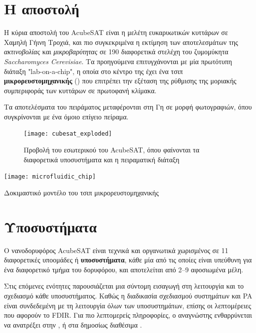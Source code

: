 \documentclass[a4paper,nobib]{tufte-book}
\begin{document}
\section{Η αποστολή}


Η κύρια αποστολή του AcubeSAT είναι η μελέτη ευκαρυωτικών κυττάρων σε Χαμηλή Γήινη Τροχιά, και πιο συγκεκριμένα η εκτίμηση των αποτελεσμάτων της \emph{ακτινοβολίας} και \emph{μικροβαρύτητας} σε 190 διαφορετικά στελέχη του ζυμομύκητα \emph{Saccharomyces Cerevisiae}. Τα προηγούμενα επιτυγχάνονται με μία πρωτότυπη διάταξη "lab-on-a-chip", η οποία στο κέντρο της έχει ένα τσιπ \textbf{μικρορευστομηχανικής} () \parencite{volpetti_microfluidic_biodisplay_2017} που επιτρέπει την εξέταση της ρύθμισης της μοριακής συμπεριφοράς των κυττάρων σε πρωτοφανή κλίμακα.

Τα αποτελέσματα του πειράματος μεταφέρονται στη Γη σε μορφή φωτογραφιών, όπου συγκρίνονται με ένα όμοιο επίγειο πείραμα.



\begin{figure}[th]
	\centering
	\texttt{[image: cubesat\_exploded]}
	\caption{Προβολή του εσωτερικού του AcubeSAT, όπου φαίνονται τα διαφορετικά υποσυστήματα και η πειραματική διάταξη}
\end{figure}

\begin{marginfigure}
	\texttt{[image: microfluidic\_chip]}
	\caption{Δοκιμαστικό μοντέλο του τσιπ μικρορευστομηχανικής}
	\label{fig:microfluidic_chip}
\end{marginfigure}

\section{Υποσυστήματα}

Ο νανοδορυφόρος AcubeSAT είναι τεχνικά και οργανωτικά χωρισμένος σε 11 διαφορετικές υποομάδες ή \textbf{υποσυστήματα}, κάθε μία από τις οποίες είναι υπεύθυνη για ένα διαφορετικό τμήμα του δορυφόρου, και αποτελείται από \SIrange{2}{9}{} αφοσιωμένα μέλη.

Στις επόμενες ενότητες παρουσιάζεται μια σύντομη εισαγωγή στη λειτουργία και το σχεδιασμό κάθε υποσυστήματος. Καθώς η διαδικασία σχεδιασμού συστημάτων και \acl{PA} είναι %
συνδεδεμένη με τη λειτουργία όλων των υποσυστημάτων,  επίσης οι λεπτομέρειες που αφορούν το \acs{FDIR}. Για πιο λεπτομερείς πληροφορίες, ο αναγνώστης ενθαρρύνεται να ανατρέξει στην , ή στα δημοσίως διαθέσιμα .
\end{document}
